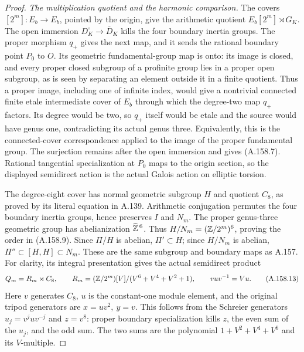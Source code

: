 \begin{proof}
\emph{The multiplication quotient and the harmonic comparison.}
The covers \([2^m]:E_b\to E_b\), pointed by the origin,
give the arithmetic quotient \(E_b[2^m]\rtimes G_K\).
The open immersion \(D^\circ_K\to\overline D_K\) kills
the four boundary inertia groups.  The proper morphism
\(q_+\) gives the next map, and it sends the rational
boundary point \(P_0\) to \(O\).
Its geometric fundamental-group map is onto: its image
is closed, and every proper closed subgroup of a profinite
group lies in a proper open subgroup, as is seen by
separating an element outside it in a finite quotient.
Thus a proper image, including one of infinite index,
would give a nontrivial connected finite
etale intermediate cover of \(E_b\) through which the
degree-two map \(q_+\) factors.  Its degree would be two,
so \(q_+\) itself would be etale and the source would have
genus one, contradicting its actual genus three.
Equivalently, this is the connected-cover correspondence
applied to the image of the proper fundamental group.
The surjection remains after the open immersion and gives
(A.158.7).  Rational tangential specialization at \(P_0\)
maps to the origin section, so the displayed semidirect
action is the actual Galois action on elliptic torsion.

The degree-eight cover has normal geometric subgroup \(H\)
and quotient \(C_8\), as proved by its literal equation
in A.139.  Arithmetic conjugation permutes the four
boundary inertia groups, hence preserves \(I\) and \(N_m\).
The proper genus-three geometric group has abelianization
\(\widehat{\mathbb Z}^{\,6}\).  Thus
\(H/N_m=(\mathbb Z/2^m)^6\), proving the order in (A.158.9).
Since \(\Pi/H\) is abelian, \(\Pi'\subset H\); since
\(H/N_m\) is abelian, \(\Pi''\subset[H,H]\subset N_m\).
These are the same subgroup and boundary maps as A.157.
For clarity, its integral presentation gives the actual
semidirect product
\[
 Q_m=R_m\rtimes C_8,\qquad
 R_m=(\mathbb Z/2^m)[V]/(V^6+V^4+V^2+1),
 \qquad vuv^{-1}=Vu.
\tag{A.158.13}
\]
Here \(v\) generates \(C_8\), \(u\) is the constant-one
module element, and the original tripod generators are
\(x=uv^2,\ y=v\).  This follows from the Schreier
generators \(u_j=v^juv^{-j}\) and \(z=v^8\): proper
boundary specialization kills \(z\), the even sum of
the \(u_j\), and the odd sum.  The two sums are the
polynomial \(1+V^2+V^4+V^6\) and its \(V\)-multiple.


\end{proof}
